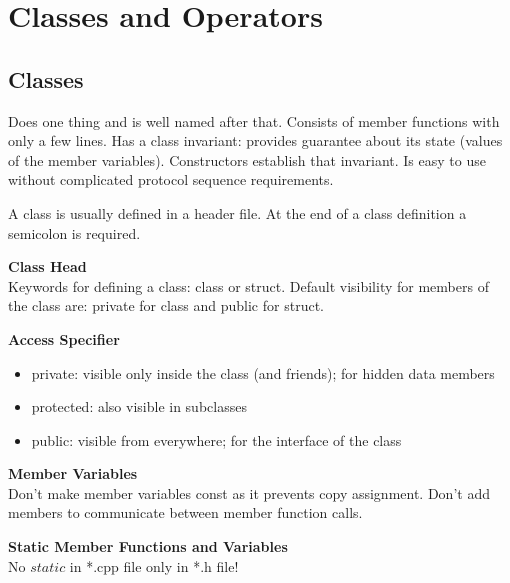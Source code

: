 
\section{Classes and Operators}
\subsection{Classes}
Does one thing and is well named after that. Consists of member functions with only a few lines. Has a class invariant: provides guarantee about its state (values of the member variables). Constructors establish that invariant. Is easy to use without complicated protocol sequence requirements.

A class is usually defined in a header file. At the end of a class definition a
semicolon is required. 

\textbf{Class Head} \\
Keywords for defining a class: class or struct. Default visibility for members of the class are: private for class and public for struct.

\textbf{Access Specifier}
\begin{itemize}
  \itemsep -0.5em 
  \item private: visible only inside the class (and friends); for hidden data members
  \item protected: also visible in subclasses 
  \item public: visible from everywhere; for the interface of the class
\end{itemize}

\textbf{Member Variables} \\
Don't make member variables const as it prevents copy assignment. Don't add members to communicate
between member function calls.

\textbf{Static Member Functions and Variables}\\
No $static$ in *.cpp file only in *.h file!

